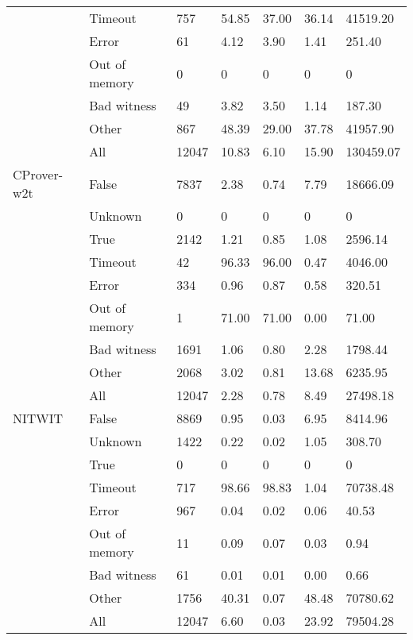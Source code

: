 \documentclass[notitlepage]{article}
\begin{document}
\begin{tabular}{lllllll}
       & Timeout &       757 & 54.85 &  37.00 &    36.14 &  41519.20 \\
       & Error &        61 &  4.12 &   3.90 &     1.41 &    251.40 \\
       & Out of memory &         0 &     0 &      0 &        0 &         0 \\
       & Bad witness &        49 &  3.82 &   3.50 &     1.14 &    187.30 \\
       & Other &       867 & 48.39 &  29.00 &    37.78 &  41957.90 \\
       & All &     12047 & 10.83 &   6.10 &    15.90 & 130459.07 \\
CProver-w2t & False &      7837 &  2.38 &   0.74 &     7.79 &  18666.09 \\
       & Unknown &         0 &     0 &      0 &        0 &         0 \\
       & True &      2142 &  1.21 &   0.85 &     1.08 &   2596.14 \\
       & Timeout &        42 & 96.33 &  96.00 &     0.47 &   4046.00 \\
       & Error &       334 &  0.96 &   0.87 &     0.58 &    320.51 \\
       & Out of memory &         1 & 71.00 &  71.00 &     0.00 &     71.00 \\
       & Bad witness &      1691 &  1.06 &   0.80 &     2.28 &   1798.44 \\
       & Other &      2068 &  3.02 &   0.81 &    13.68 &   6235.95 \\
       & All &     12047 &  2.28 &   0.78 &     8.49 &  27498.18 \\
NITWIT & False &      8869 &  0.95 &   0.03 &     6.95 &   8414.96 \\
       & Unknown &      1422 &  0.22 &   0.02 &     1.05 &    308.70 \\
       & True &         0 &     0 &      0 &        0 &         0 \\
       & Timeout &       717 & 98.66 &  98.83 &     1.04 &  70738.48 \\
       & Error &       967 &  0.04 &   0.02 &     0.06 &     40.53 \\
       & Out of memory &        11 &  0.09 &   0.07 &     0.03 &      0.94 \\
       & Bad witness &        61 &  0.01 &   0.01 &     0.00 &      0.66 \\
       & Other &      1756 & 40.31 &   0.07 &    48.48 &  70780.62 \\
       & All &     12047 &  6.60 &   0.03 &    23.92 &  79504.28 \\
\bottomrule
\end{tabular}
\end{document}
